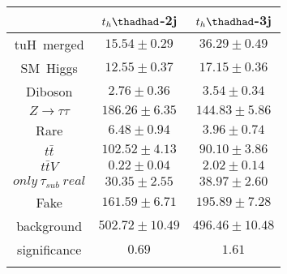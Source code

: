 \centering
\begin{tabular}{|ccc} \toprule\toprule
 & $t_{h}\thadhad$-2j & $t_{h}\thadhad$-3j\\\midrule
tuH~merged & $15.54\pm0.29$ & $36.29\pm0.49$\\
SM~Higgs & $12.55\pm0.37$ & $17.15\pm0.36$\\
Diboson & $2.76\pm0.36$ & $3.54\pm0.34$\\
$Z\to\tau\tau$ & $186.26\pm6.35$ & $144.83\pm5.86$\\
Rare & $6.48\pm0.94$ & $3.96\pm0.74$\\
$t\bar{t}$ & $102.52\pm4.13$ & $90.10\pm3.86$\\
$t\bar{t}V$ & $0.22\pm0.04$ & $2.02\pm0.14$\\
$only~\tau_{sub}~real$ & $30.35\pm2.55$ & $38.97\pm2.60$\\
Fake & $161.59\pm6.71$ & $195.89\pm7.28$\\
background & $502.72\pm10.49$ & $496.46\pm10.48$\\
significance & $0.69$ & $1.61$\\
\bottomrule\bottomrule\\
\end{tabular}
